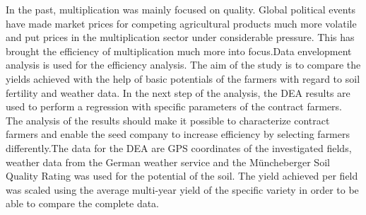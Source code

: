 
\begin{Abstrakt}
    In the past, multiplication was mainly focused on quality. Global political events have made market prices for competing agricultural products much more volatile and put prices in the multiplication sector under considerable pressure. This has brought the efficiency of multiplication much more into focus.\newline Data envelopment analysis is used for the efficiency analysis. The aim of the study is to compare the yields achieved with the help of basic potentials of the farmers with regard to soil fertility and weather data. In the next step of the analysis, the DEA results are used to perform a regression with specific parameters of the contract farmers. The analysis of the results should make it possible to characterize contract farmers and enable the seed company to increase efficiency by selecting farmers differently.\newline The data for the DEA are GPS coordinates of the investigated fields, weather data from the German weather service and the Müncheberger Soil Quality Rating was used for the potential of the soil. The yield achieved per field was scaled using the average multi-year yield of the specific variety in order to be able to compare the complete data.
\end{Abstrakt}



\clearpage